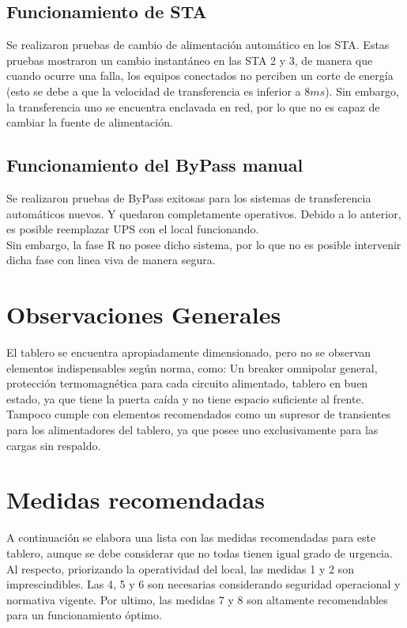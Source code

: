 \documentclass{article}
\begin{document}
\subsection{Funcionamiento de STA}
Se realizaron pruebas de cambio de alimentación automático en los STA. 
Estas pruebas mostraron un cambio instantáneo en las STA 2 y 3, de manera que cuando ocurre una falla, los equipos conectados no perciben un corte de energía (esto se debe a que la velocidad de transferencia es inferior a $8 ms$).
Sin embargo, la transferencia uno se encuentra enclavada en red, por lo que no es capaz de cambiar la fuente de alimentación.

\subsection{Funcionamiento del ByPass manual}
Se realizaron pruebas de ByPass exitosas para los sistemas de transferencia automáticos nuevos. Y quedaron completamente operativos.
Debido a lo anterior, es posible reemplazar UPS con el local funcionando.\\
Sin embargo, la fase R no posee dicho sistema, por lo que no es posible intervenir dicha fase con linea viva de manera segura.
\section{Observaciones Generales}
El tablero se encuentra apropiadamente dimensionado, pero no se observan elementos indispensables según norma, como: Un breaker omnipolar general, protección termomagnética para cada circuito alimentado, tablero en buen estado, ya que tiene la puerta caída y no tiene espacio suficiente al frente. Tampoco cumple con elementos recomendados como un supresor de transientes para los alimentadores del tablero, ya que posee uno exclusivamente para las cargas sin respaldo.

\section{Medidas recomendadas}
A continuación se elabora una lista con las medidas recomendadas para este tablero, aunque se debe considerar que no todas tienen igual grado de urgencia. Al respecto, priorizando la operatividad del local, las medidas 1 y 2 son imprescindibles. Las 4, 5 y 6 son necesarias considerando seguridad operacional y normativa vigente. Por ultimo, las medidas 7 y 8 son altamente recomendables para un funcionamiento óptimo.
\end{document}
